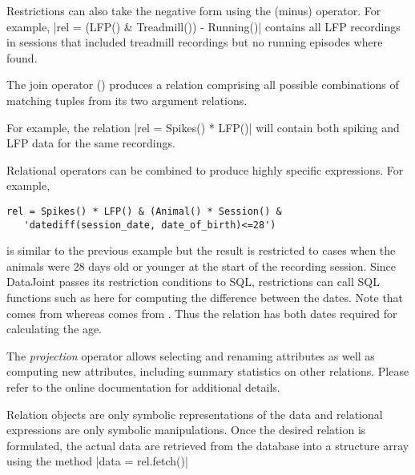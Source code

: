 Restrictions can also take the negative form using the \matlab{-} (minus) operator. For example,
|rel = (LFP() & Treadmill()) - Running()|
contains all LFP recordings in sessions that included treadmill recordings but no running episodes where found.

The join operator (\matlab{*}) produces a relation comprising all possible combinations of matching tuples from its two argument relations.

For example, the relation
|rel = Spikes() * LFP()|
will contain both spiking and LFP data for the same  recordings.

Relational operators can be combined to produce highly specific expressions.  
For example,
\begin{verbatim}
rel = Spikes() * LFP() & (Animal() * Session() & 
   'datediff(session_date, date_of_birth)<=28')
\end{verbatim}
is similar to the previous example but the result is restricted to cases when the animals were 28 days old or younger at the start of the recording session.
Since DataJoint passes its restriction conditions to SQL, restrictions can call SQL functions such as  here for computing the difference between the dates. 
Note that  comes from  whereas  comes from . 
Thus the relation  has both dates required for calculating the age. 

The \emph{projection} operator allows selecting and renaming attributes as well as computing new attributes, including summary statistics on other relations.  Please refer to the online documentation for additional details.

Relation objects are only symbolic representations of the data and relational expressions are only symbolic manipulations.
Once the desired relation is formulated, the actual data are retrieved from the database into a structure array using the  method
|data = rel.fetch()|
